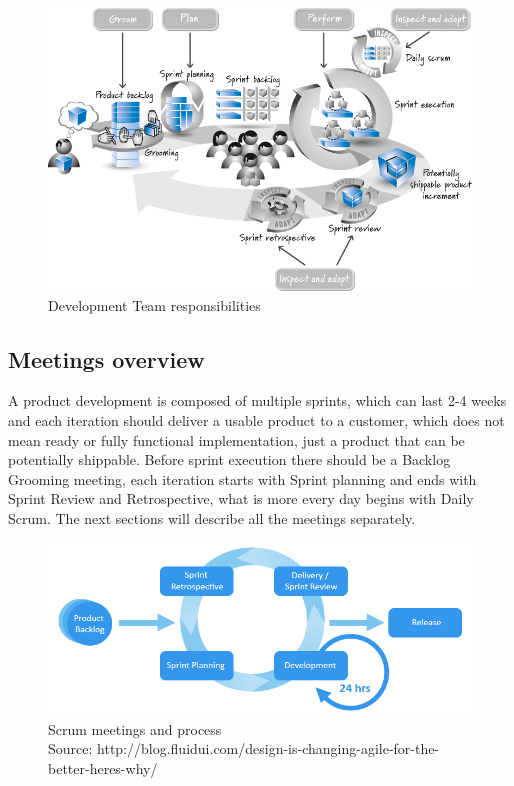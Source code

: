 \begin{figure}[h]
\caption{Development Team responsibilities \cite{ScrumBook}}
\label{fig:devtRes}
\centering
\includegraphics[width=1\textwidth]{img/developmentRes}
\end{figure}

\subsection{Meetings overview}
\label{chap:meetingsOverview}

A product development is composed of multiple sprints, which can last 2-4 weeks \cite{ScrumBook} and each iteration should deliver a usable product to a customer, which does not mean ready or fully functional implementation, just a product that can be potentially shippable. Before sprint execution there should be a Backlog Grooming meeting, each iteration starts with Sprint planning and ends with Sprint Review and Retrospective, what is more every day begins with Daily Scrum. The next sections will describe all the meetings separately. 

\begin{figure}[h]
\caption{Scrum meetings and process 
\\ Source: http://blog.fluidui.com/design-is-changing-agile-for-the-better-heres-why/}
\label{fig:meetingsScrum}
\centering
\includegraphics[width=1\textwidth]{img/agile-graphic}
\end{figure}

